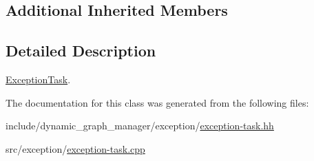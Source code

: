 \subsection*{Additional Inherited Members}


\subsection{Detailed Description}
\hyperlink{classdynamic__graph_1_1ExceptionTask}{Exception\+Task}. 

The documentation for this class was generated from the following files\+:\begin{DoxyCompactItemize}
\item 
include/dynamic\+\_\+graph\+\_\+manager/exception/\hyperlink{exception-task_8hh}{exception-\/task.\+hh}\item 
src/exception/\hyperlink{exception-task_8cpp}{exception-\/task.\+cpp}\end{DoxyCompactItemize}
